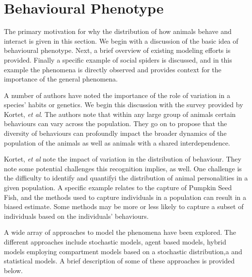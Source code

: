 \documentclass[12pt]{article}
\begin{document}
\section{Behavioural Phenotype}
\label{section:behaviouralPhenotype}

The primary motivation for why the distribution of how animals behave
and interact is given in this section. We begin with a discussion of
the basic idea of behavioural phenotype. Next, a brief overview of
existing modeling efforts is provided. Finally a specific example of
social spiders is discussed, and in this example the phenomena is
directly observed and provides context for the importance of the
general phenomena.

A number of authors have noted the importance of the role of variation
in a species' habits or
genetics\cite{doi:10.1111/j.1461-0248.2010.01536.x,doi:10.1086/687235,mierzejewski_horn_luong_2019,SANTICCHIA20191}. We
begin this discussion with the survey provided by Kortet, \textit{et
  al}\cite{doi:10.1111/j.1461-0248.2010.01536.x}. The authors note
that within any large group of animals certain behaviours can vary
across the population. They go on to propose that the diversity of
behaviours can profoundly impact the broader dynamics of the
population of the animals as well as animals with a shared
interdependence.

Kortet, \textit{et al}\cite{doi:10.1111/j.1461-0248.2010.01536.x} note
the impact of variation in the distribution of behaviour. They note
some potential challenges this recognition implies, as well. One
challenge is the difficulty to identify and quantifyi the distribution
of animal personalities in a given population. A specific example
relates to the capture of Pumpkin Seed
Fish\cite{doi:10.1037/0735-7036.107.3.250}, and the methods used to
capture individuals in a population can result in a biased estimate.
Some methods may be more or less likely to capture a subset of
individuals based on the individuals' behaviours.


A wide array of approaches to model the phenomena have been
explored. The different approaches include stochastic
models\cite{Keeling65}, agent based models\cite{doi:10.1086/687235},
hybrid models employing compartment models based on a stochastic
distribution\cite{doi:10.1098/rspb.2001.1599},a and statistical
models\cite{SuperspreadingLloyd}. A brief description of some of these
approaches is provided below.
\end{document}
